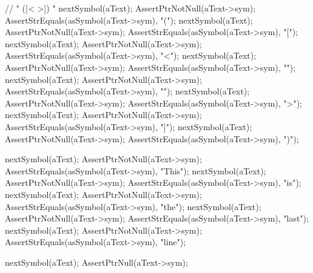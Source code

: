   // " ([<{ }>]) "
  nextSymbol(aText);
  AssertPtrNotNull(aText->sym);
  AssertStrEquals(asSymbol(aText->sym), "(");
  nextSymbol(aText);
  AssertPtrNotNull(aText->sym);
  AssertStrEquals(asSymbol(aText->sym), "[");
  nextSymbol(aText);
  AssertPtrNotNull(aText->sym);
  AssertStrEquals(asSymbol(aText->sym), "<");
  nextSymbol(aText);
  AssertPtrNotNull(aText->sym);
  AssertStrEquals(asSymbol(aText->sym), "{");
  nextSymbol(aText);
  AssertPtrNotNull(aText->sym);
  AssertStrEquals(asSymbol(aText->sym), "}");
  nextSymbol(aText);
  AssertPtrNotNull(aText->sym);
  AssertStrEquals(asSymbol(aText->sym), ">");
  nextSymbol(aText);
  AssertPtrNotNull(aText->sym);
  AssertStrEquals(asSymbol(aText->sym), "]");
  nextSymbol(aText);
  AssertPtrNotNull(aText->sym);
  AssertStrEquals(asSymbol(aText->sym), ")");

  nextSymbol(aText);
  AssertPtrNotNull(aText->sym);
  AssertStrEquals(asSymbol(aText->sym), "This");
  nextSymbol(aText);
  AssertPtrNotNull(aText->sym);
  AssertStrEquals(asSymbol(aText->sym), "is");
  nextSymbol(aText);
  AssertPtrNotNull(aText->sym);
  AssertStrEquals(asSymbol(aText->sym), "the");
  nextSymbol(aText);
  AssertPtrNotNull(aText->sym);
  AssertStrEquals(asSymbol(aText->sym), "last");
  nextSymbol(aText);
  AssertPtrNotNull(aText->sym);
  AssertStrEquals(asSymbol(aText->sym), "line");

  nextSymbol(aText);
  AssertPtrNull(aText->sym);
\stopCTest
\stopTestCase
\stopTestSuite